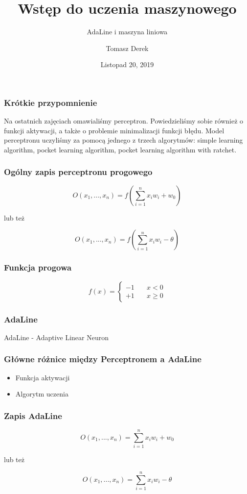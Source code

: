 \documentclass[16pt]{beamer}
\title{Wstęp do uczenia maszynowego}
\subtitle{AdaLine i maszyna liniowa}
\author{Tomasz Derek}
\institute{KMS}
\date{Listopad 20, 2019}
\begin{document}
 
\frame{\titlepage}
 
\begin{frame}
\frametitle{Krótkie przypomnienie}
\begin{center}
\justifying
Na ostatnich zajęciach omawialiśmy perceptron. Powiedzieliśmy sobie również o funkcji aktywacji, a także o problemie minimalizacji funkcji błędu. Model perceptronu uczyliśmy za pomocą jednego z trzech algorytmów: simple learning algorithm, pocket learning algorithm, pocket learning algorithm with ratchet.
\end{center}
\end{frame} 
 
\begin{frame}
\frametitle{Ogólny zapis perceptronu progowego}
\[
    O(x_1, ..., x_n) = f(\sum_{i=1}^{n}x_iw_i + w_0)
\]
\begin{center}
    lub też
\end{center}
\[
    O(x_1, ..., x_n) = f(\sum_{i=1}^{n}x_iw_i - \theta)
\]
\end{frame} 
 
\begin{frame}
\frametitle{Funkcja progowa}
\[ f(x) =
  \begin{cases}
    -1       & \quad x < 0\\
    +1  & \quad x \geq 0
  \end{cases}
\]
\end{frame}

\begin{frame}
\frametitle{AdaLine}
\begin{center}
AdaLine - Adaptive Linear Neuron
\end{center}
\end{frame}

\begin{frame}
\frametitle{Główne różnice między Perceptronem a AdaLine}
\begin{itemize}
	\item Funkcja aktywacji
	\item Algorytm uczenia
\end{itemize}
\end{frame}

\begin{frame}
\frametitle{Zapis AdaLine}
\[
    O(x_1, ..., x_n) = \sum_{i=1}^{n}x_iw_i + w_0
\]
\begin{center}
    lub też
\end{center}
\[
    O(x_1, ..., x_n) = \sum_{i=1}^{n}x_iw_i - \theta
\]
\end{frame} 
\end{document}
